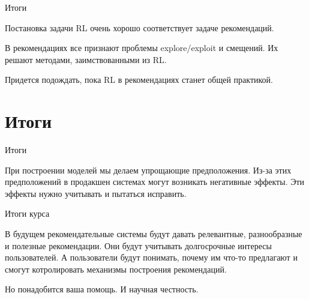 \documentclass[11pt,aspectratio=169,handout]{beamer}
\begin{document}
\begin{frame}{Итоги}

\begin{tcolorbox}[colback=info!5,colframe=info!80,title=]
Постановка задачи RL очень хорошо соответствует задаче рекомендаций.
\end{tcolorbox}

\vfill

\begin{tcolorbox}[colback=info!5,colframe=info!80,title=]
В рекомендациях все признают проблемы explore/exploit и смещений. Их решают методами, заимствованными из RL.
\end{tcolorbox}

\vfill

\begin{tcolorbox}[colback=warn!5,colframe=warn!80,title=]
Придется подождать, пока RL в рекомендациях станет общей практикой.
\end{tcolorbox}

\end{frame}

\section{Итоги}

\begin{frame}{Итоги}

\begin{tcolorbox}[colback=info!5,colframe=info!80,title=]
При построении моделей мы делаем упрощающие предположения. Из-за этих предположений в продакшен системах могут возникать негативные эффекты. Эти эффекты нужно учитывать и пытаться исправить.
\end{tcolorbox}

\end{frame}

\begin{frame}{Итоги курса}

\begin{tcolorbox}[colback=info!5,colframe=info!80,title=]
В будущем рекомендательные системы будут давать релевантные, разнообразные и полезные рекомендации. Они будут учитывать долгосрочные интересы пользователей. А пользователи будут понимать, почему им что-то предлагают и смогут котролировать механизмы построения рекомендаций.
\end{tcolorbox}

\begin{tcolorbox}[colback=info!5,colframe=info!80,title=]
Но понадобится ваша помощь. И научная честность.
\end{tcolorbox}

\end{frame}
\end{document}
